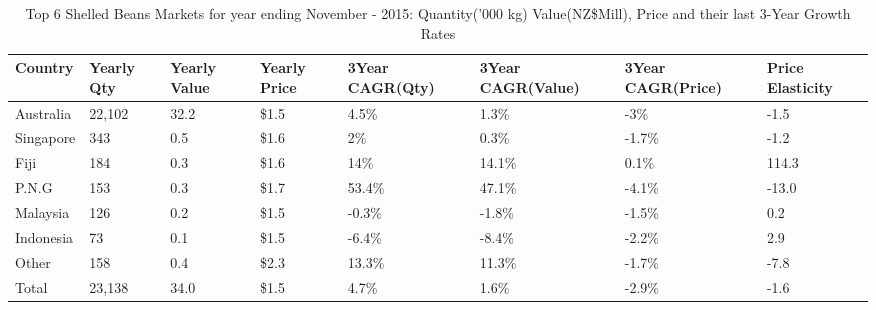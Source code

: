\begin{table}[ht]
\centering
{\scriptsize
\begin{tabular}[t]{p{1.8cm}>{\hfill}p{1.4cm}>{\hfill}p{1.4cm}>{\hfill}p{1.6cm}>{\hfill}p{1.9cm}>{\hfill}p{2cm}>{\hfill}p{1.9cm}>{\hfill}p{1.5cm}}
 \textbf{Country} & \textbf{Yearly Qty} & \textbf{Yearly Value} & \textbf{Yearly Price} & \textbf{3Year CAGR(Qty)} & \textbf{3Year CAGR(Value)} & \textbf{3Year CAGR(Price)} & \textbf{Price Elasticity} \\
\hline
Australia & 22,102 & 32.2 & \$1.5 & 4.5\% & 1.3\% & -3\% & -1.5 \\  
Singapore & 343 & 0.5 & \$1.6 & 2\% & 0.3\% & -1.7\% & -1.2 \\  
Fiji & 184 & 0.3 & \$1.6 & 14\% & 14.1\% & 0.1\% & 114.3 \\  
P.N.G & 153 & 0.3 & \$1.7 & 53.4\% & 47.1\% & -4.1\% & -13.0 \\  
Malaysia & 126 & 0.2 & \$1.5 & -0.3\% & -1.8\% & -1.5\% & 0.2 \\  
Indonesia & 73 & 0.1 & \$1.5 & -6.4\% & -8.4\% & -2.2\% & 2.9 \\  
Other & 158 & 0.4 & \$2.3 & 13.3\% & 11.3\% & -1.7\% & -7.8 \\  
Total & 23,138 & 34.0 & \$1.5 & 4.7\% & 1.6\% & -2.9\% & -1.6 \\  
\hline
\end{tabular}
}
\caption{\scriptsize Top 6 Shelled Beans Markets for year ending November - 2015: Quantity('000 kg) Value(NZ\$Mill), Price and their last 3-Year Growth Rates}
\end{table}

